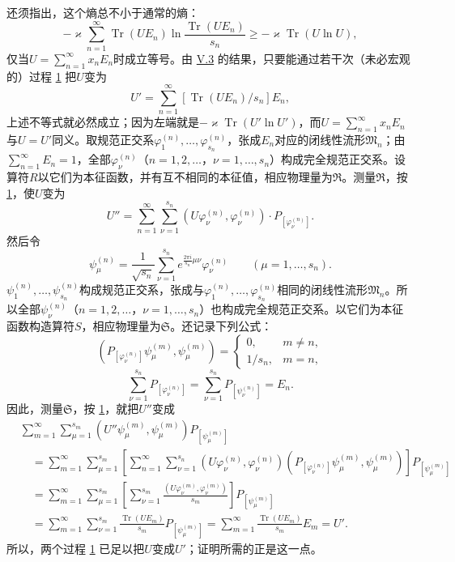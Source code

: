 \documentclass[fontsize=13pt,twoside,openany,headings=normal,parskip=false,bookmarkpackage=false,DIV=calc]{scrbook}
\begin{document}
还须指出，这个熵总不小于通常的熵：
\[
-\varkappa\sum_{n=1}^{\infty}\operatorname{Tr}(UE_n)
\ln\frac{\operatorname{Tr}(UE_n)}{s_n}
\geq-\varkappa\operatorname{Tr}(U\ln U),
\]
仅当$U=\sum_{n=1}^{\infty}x_nE_n$时成立等号。由 \hyperref[sec:V.3]{V.3} 的结果，只要能通过若干次（未必宏观的）过程 \hyperref[eq:V.1.1]{1} 把$U$变为
\[
U'=\sum_{n=1}^{\infty}[\operatorname{Tr}(UE_n)/s_n]E_n,
\]
上述不等式就必然成立；因为左端就是$-\varkappa\operatorname{Tr}(U'\ln U')$，而$U=\sum_{n=1}^{\infty}x_nE_n$与$U=U'$同义。取规范正交系$\varphi_1^{(n)},\allowbreak \ldots,\allowbreak \varphi_{s_n}^{(n)}$，张成$E_n$对应的闭线性流形$\mathfrak M_n$；由$\sum_{n=1}^{\infty}E_n=1$，全部$\varphi_\nu^{(n)}$（$n=1,\allowbreak 2,\allowbreak \ldots$，$\nu=1,\allowbreak \ldots,\allowbreak s_n$）构成完全规范正交系。设算符$R$以它们为本征函数，并有互不相同的本征值，相应物理量为$\mathfrak R$。测量$\mathfrak R$，按 \hyperref[eq:V.1.1]{1}，使$U$变为
\[
U''=\sum_{n=1}^{\infty}\sum_{\nu=1}^{s_n}
(U\varphi_\nu^{(n)},\varphi_\nu^{(n)})\cdot P_{[\varphi_\nu^{(n)}]}.
\]
然后令
\[
\psi_\mu^{(n)}=\frac1{\sqrt{s_n}}\sum_{\nu=1}^{s_n}
 e^{\frac{2\pi i}{s_n}\mu\nu}\varphi_\nu^{(n)}
\qquad(\mu=1,\ldots,s_n).
\]
$\psi_1^{(n)},\allowbreak \ldots,\allowbreak \psi_{s_n}^{(n)}$构成规范正交系，张成与$\varphi_1^{(n)},\allowbreak \ldots,\allowbreak \varphi_{s_n}^{(n)}$相同的闭线性流形$\mathfrak M_n$。所以全部$\psi_\nu^{(n)}$（$n=1,\allowbreak 2,\allowbreak \ldots$，$\nu=1,\allowbreak \ldots,\allowbreak s_n$）也构成完全规范正交系。以它们为本征函数构造算符$S$，相应物理量为$\mathfrak S$。还记录下列公式：
\[
(P_{[\varphi_\nu^{(n)}]}\psi_\mu^{(m)},\psi_\mu^{(m)})
=\begin{cases}0,&m\ne n,\\1/s_n,&m=n,\end{cases}
\]
\[
\sum_{\nu=1}^{s_n}P_{[\varphi_\nu^{(n)}]}
=\sum_{\nu=1}^{s_n}P_{[\psi_\nu^{(n)}]}=E_n.
\]\hypertarget{origpage-221}{}\label{origpage-221}因此，测量$\mathfrak S$，按 \hyperref[eq:V.1.1]{1}，就把$U''$变成
\begin{align*}
&\sum_{m=1}^{\infty}\sum_{\mu=1}^{s_m}(U''\psi_\mu^{(m)},\psi_\mu^{(m)})P_{[\psi_\mu^{(m)}]}\\
&\quad=\sum_{m=1}^{\infty}\sum_{\mu=1}^{s_m}
\left[\sum_{n=1}^{\infty}\sum_{\nu=1}^{s_n}(U\varphi_\nu^{(n)},\varphi_\nu^{(n)})
(P_{[\varphi_\nu^{(n)}]}\psi_\mu^{(m)},\psi_\mu^{(m)})\right]P_{[\psi_\mu^{(m)}]}\\
&\quad=\sum_{m=1}^{\infty}\sum_{\mu=1}^{s_m}
\left[\sum_{\nu=1}^{s_m}\frac{(U\varphi_\nu^{(m)},\varphi_\nu^{(m)})}{s_m}\right]P_{[\psi_\mu^{(m)}]}\\
&\quad=\sum_{m=1}^{\infty}\sum_{\nu=1}^{s_m}
\frac{\operatorname{Tr}(UE_m)}{s_m}P_{[\psi_\mu^{(m)}]}
=\sum_{m=1}^{\infty}\frac{\operatorname{Tr}(UE_m)}{s_m}E_m=U'.
\end{align*}
所以，两个过程 \hyperref[eq:V.1.1]{1} 已足以把$U$变成$U'$；证明所需的正是这一点。
\end{document}
